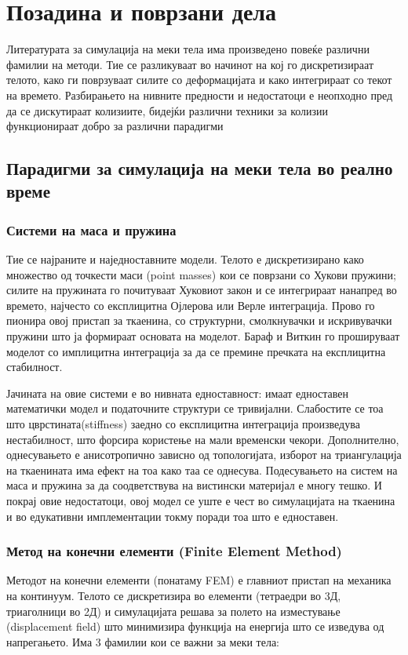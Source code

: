 \newpage
\chapter{Позадина и поврзани дела} \label{related}
Литературата за симулација на меки тела има произведено повеќе различни фамилии на методи. Тие се разликуваат во начинот на кој го дискретизираат телото, како ги поврзуваат силите со деформацијата и како интегрираат со текот на времето. Разбирањето на нивните предности и недостатоци е неопходно пред да се дискутираат колизиите, бидејќи различни техники за колизии функционираат добро за различни парадигми

\section{Парадигми за симулација на меки тела во реално време}
\subsection{Системи на маса и пружина}
Тие се најраните и наједноставните модели. Телото е дискретизирано како множество од точкести маси (point masses) кои се поврзани со Хукови пружини; силите на пружината го почитуваат Хуковиот закон и се интегрираат нанапред во времето, најчесто со експлицитна Ојлерова или Верле интеграција. Прово \cite{Provot1995DeformationCI} го пионира овој пристап за ткаенина, со структурни, смолкнувачки и искривувачки пружини што ја формираат основата на моделот. Бараф и Виткин \cite{BaraffDavidWitkin1998} го прошируваат моделот со имплицитна интеграција за да се премине пречката на експлицитна стабилност. 

Јачината на овие системи е во нивната едноставност: имаат едноставен математички модел и податочните структури се тривијални. Слабостите се тоа што цврстината(stiffness) заедно со експлицитна интеграција произведува нестабилност, што форсира користење на мали временски чекори. Дополнително, однесувањето е анисотропично зависно од топологијата, изборот на триангулација на ткаенината има ефект на тоа како таа се однесува. Подесувањето на систем на маса и пружина за да соодветствува на вистински материјал е многу тешко. И покрај овие недостатоци, овој модел се уште е чест во симулацијата на ткаенина и во едукативни имплементации токму поради тоа што е едноставен.

\subsection{Метод на конечни елементи (Finite Element Method)}
Методот на конечни елементи (понатаму FEM) е главниот пристап на механика на континуум. Телото се дискретизира во елементи (тетраедри во 3Д, триаголници во 2Д) и симулацијата решава за полето на изместување (displacement field) што минимизира функција на енергија што се изведува од напрегањето. Има 3 фамилии кои се важни за меки тела:

